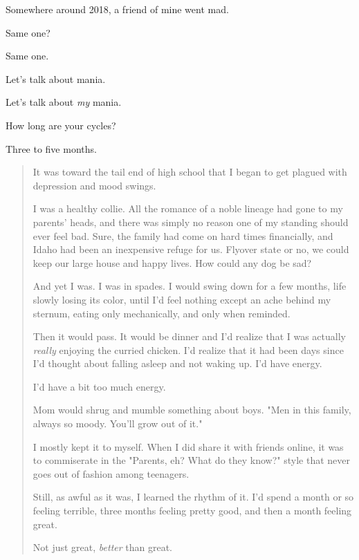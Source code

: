 \newpage


Somewhere around 2018, a friend of mine went mad.

\begin{ally}
Same one?
\end{ally}
Same one.

\begin{ally}
Let's talk about mania.
\end{ally}
Let's talk about \emph{my} mania.

\begin{ally}
How long are your cycles?
\end{ally}
Three to five months.

\begin{quotation}
    It was toward the tail end of high school that I began to get plagued with depression and mood swings.

I was a healthy collie. All the romance of a noble lineage had gone to my parents' heads, and there was simply no reason one of my standing should ever feel bad. Sure, the family had come on hard times financially, and Idaho had been an inexpensive refuge for us. Flyover state or no, we could keep our large house and happy lives. How could any dog be sad?

And yet I was. I was in spades. I would swing down for a few months, life slowly losing its color, until I'd feel nothing except an ache behind my sternum, eating only mechanically, and only when reminded.

Then it would pass. It would be dinner and I'd realize that I was actually \emph{really} enjoying the curried chicken. I'd realize that it had been days since I'd thought about falling asleep and not waking up. I'd have energy.

I'd have a bit too much energy.

Mom would shrug and mumble something about boys. "Men in this family, always so moody. You'll grow out of it."

I mostly kept it to myself. When I did share it with friends online, it was to commiserate in the "Parents, eh? What do they know?" style that never goes out of fashion among teenagers.

Still, as awful as it was, I learned the rhythm of it. I'd spend a month or so feeling terrible, three months feeling pretty good, and then a month feeling great.

Not just great, \emph{better} than great.


\end{quotation}
